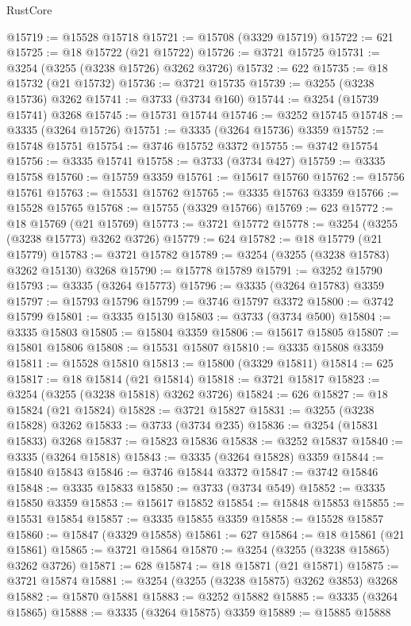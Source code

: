 \begin{lexlean}{RustCore}
\begin{coremodule}
@15719 := @15528 @15718
@15721 := @15708 (@3329 @15719)
@15722 := 621
@15725 := @18 @15722 (@21 @15722)
@15726 := @3721 @15725
@15731 := @3254 (@3255 (@3238 @15726) @3262 @3726)
@15732 := 622
@15735 := @18 @15732 (@21 @15732)
@15736 := @3721 @15735
@15739 := @3255 (@3238 @15736) @3262
@15741 := @3733 (@3734 @160)
@15744 := @3254 (@15739 @15741) @3268
@15745 := @15731 @15744
@15746 := @3252 @15745
@15748 := @3335 (@3264 @15726)
@15751 := @3335 (@3264 @15736) @3359
@15752 := @15748 @15751
@15754 := @3746 @15752 @3372
@15755 := @3742 @15754
@15756 := @3335 @15741
@15758 := @3733 (@3734 @427)
@15759 := @3335 @15758
@15760 := @15759 @3359
@15761 := @15617 @15760
@15762 := @15756 @15761
@15763 := @15531 @15762
@15765 := @3335 @15763 @3359
@15766 := @15528 @15765
@15768 := @15755 (@3329 @15766)
@15769 := 623
@15772 := @18 @15769 (@21 @15769)
@15773 := @3721 @15772
@15778 := @3254 (@3255 (@3238 @15773) @3262 @3726)
@15779 := 624
@15782 := @18 @15779 (@21 @15779)
@15783 := @3721 @15782
@15789 := @3254 (@3255 (@3238 @15783) @3262 @15130) @3268
@15790 := @15778 @15789
@15791 := @3252 @15790
@15793 := @3335 (@3264 @15773)
@15796 := @3335 (@3264 @15783) @3359
@15797 := @15793 @15796
@15799 := @3746 @15797 @3372
@15800 := @3742 @15799
@15801 := @3335 @15130
@15803 := @3733 (@3734 @500)
@15804 := @3335 @15803
@15805 := @15804 @3359
@15806 := @15617 @15805
@15807 := @15801 @15806
@15808 := @15531 @15807
@15810 := @3335 @15808 @3359
@15811 := @15528 @15810
@15813 := @15800 (@3329 @15811)
@15814 := 625
@15817 := @18 @15814 (@21 @15814)
@15818 := @3721 @15817
@15823 := @3254 (@3255 (@3238 @15818) @3262 @3726)
@15824 := 626
@15827 := @18 @15824 (@21 @15824)
@15828 := @3721 @15827
@15831 := @3255 (@3238 @15828) @3262
@15833 := @3733 (@3734 @235)
@15836 := @3254 (@15831 @15833) @3268
@15837 := @15823 @15836
@15838 := @3252 @15837
@15840 := @3335 (@3264 @15818)
@15843 := @3335 (@3264 @15828) @3359
@15844 := @15840 @15843
@15846 := @3746 @15844 @3372
@15847 := @3742 @15846
@15848 := @3335 @15833
@15850 := @3733 (@3734 @549)
@15852 := @3335 @15850 @3359
@15853 := @15617 @15852
@15854 := @15848 @15853
@15855 := @15531 @15854
@15857 := @3335 @15855 @3359
@15858 := @15528 @15857
@15860 := @15847 (@3329 @15858)
@15861 := 627
@15864 := @18 @15861 (@21 @15861)
@15865 := @3721 @15864
@15870 := @3254 (@3255 (@3238 @15865) @3262 @3726)
@15871 := 628
@15874 := @18 @15871 (@21 @15871)
@15875 := @3721 @15874
@15881 := @3254 (@3255 (@3238 @15875) @3262 @3853) @3268
@15882 := @15870 @15881
@15883 := @3252 @15882
@15885 := @3335 (@3264 @15865)
@15888 := @3335 (@3264 @15875) @3359
@15889 := @15885 @15888

\end{coremodule}
\end{lexlean}
